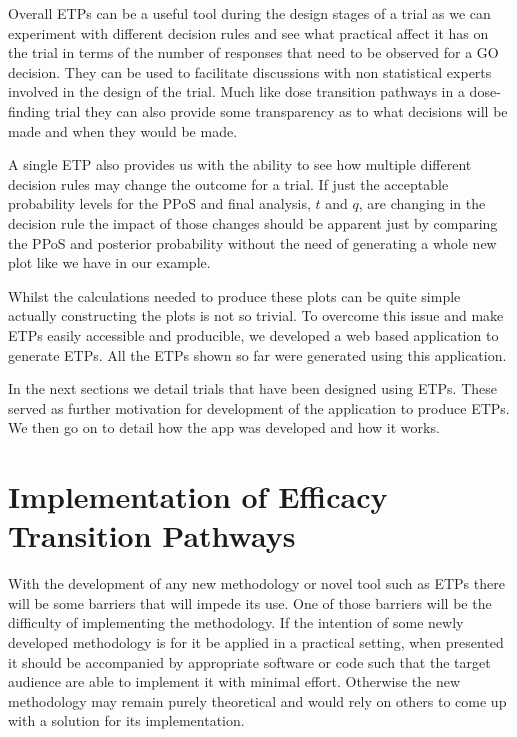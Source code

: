 Overall ETPs can be a useful tool during the design stages of a trial as we can experiment with different decision rules and see what practical affect it has on the trial in terms of the number of responses that need to be observed for a GO decision. They can be used to facilitate discussions with non statistical experts involved in the design of the trial. Much like dose transition pathways in a dose-finding trial they can also provide some transparency as to what decisions will be made and when they would be made. 

A single ETP also provides us with the ability to see how multiple different decision rules may change the outcome for a trial. If just the acceptable probability levels for the PPoS and final analysis, $t$ and $q$, are changing in the decision rule the impact of those changes should be apparent just by comparing the PPoS and posterior probability without the need of generating a whole new plot like we have in our example.

Whilst the calculations needed to produce these plots can be quite simple actually constructing the plots is not so trivial. To overcome this issue and make ETPs easily accessible and producible, we developed a web based application to generate ETPs. All the ETPs shown so far were generated using this application. 

In the next sections we detail trials that have been designed using ETPs. These served as further motivation for development of the application to produce ETPs. We then go on to detail how the app was developed and how it works.    


\section{Implementation of Efficacy Transition Pathways}

With the development of any new methodology or novel tool such as ETPs there will be some barriers that will impede its use. One of those barriers will be the difficulty of implementing the methodology. If the intention of some newly developed methodology is for it be applied in a practical setting, when presented it should be accompanied by appropriate software or code such that the target audience are able to implement it with minimal effort. Otherwise the new methodology may remain purely theoretical and would rely on others to come up with a solution for its implementation. 

